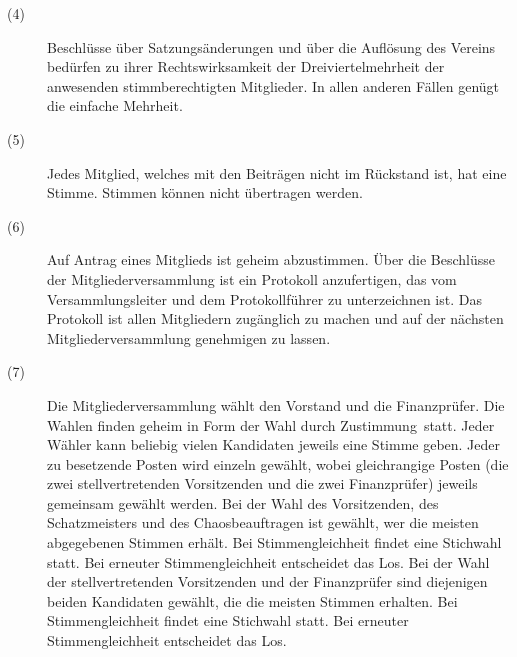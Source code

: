 \documentclass[12pt,paper=a4,ngerman]{scrreprt}
\begin{document}
\begin{description}
\item[(4)] Beschlüsse über Satzungsänderungen und über die Auflösung des Vereins bedürfen zu ihrer Rechtswirksamkeit der Dreiviertelmehrheit der anwesenden stimmberechtigten Mitglieder. In allen anderen Fällen genügt die einfache Mehrheit.
\item[(5)] Jedes Mitglied, welches mit den Beiträgen nicht im Rückstand ist, hat eine Stimme. Stimmen können nicht übertragen werden.
\item[(6)] Auf Antrag eines Mitglieds ist geheim abzustimmen. Über die Beschlüsse der Mitgliederversammlung ist ein Protokoll anzufertigen, das vom Versammlungsleiter und dem Protokollführer zu unterzeichnen ist. Das Protokoll ist allen Mitgliedern zugänglich zu machen und auf der nächsten Mitgliederversammlung genehmigen zu lassen.
\item[(7)] Die Mitgliederversammlung wählt den Vorstand und die Finanzprüfer. Die Wahlen finden geheim in Form der \glqq Wahl durch Zustimmung\grqq ~statt. Jeder Wähler kann beliebig vielen Kandidaten jeweils eine Stimme geben. Jeder zu besetzende Posten wird einzeln gewählt, wobei gleichrangige Posten (die zwei stellvertretenden Vorsitzenden und die zwei Finanzprüfer) jeweils gemeinsam gewählt werden. Bei der Wahl des Vorsitzenden, des Schatzmeisters und des Chaosbeauftragen ist gewählt, wer die meisten abgegebenen Stimmen erhält. Bei Stimmengleichheit findet eine Stichwahl statt. Bei erneuter Stimmengleichheit entscheidet das Los. Bei der Wahl der stellvertretenden Vorsitzenden und der Finanzprüfer sind diejenigen beiden Kandidaten gewählt, die die meisten Stimmen erhalten. Bei Stimmengleichheit findet eine Stichwahl statt. Bei erneuter Stimmengleichheit entscheidet das Los.
\end{description}
\end{document}
